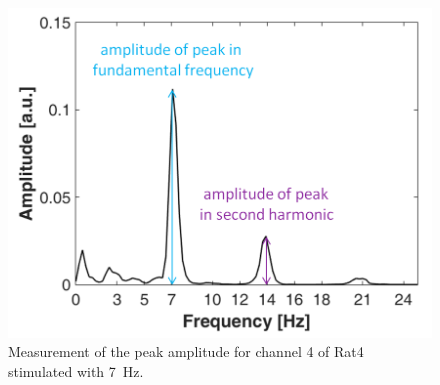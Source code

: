 \documentclass{pracalicmgr}
\begin{document}
   \begin{figure}[H]
   	\centering
   	\includegraphics[scale=0.45]{pik_widmo4.png}
   	\caption{Measurement of the peak amplitude for channel 4 of Rat4 stimulated with 7~Hz.}
   	\label{rys:pik_widmo}
   \end{figure}
   
   
\end{document}

